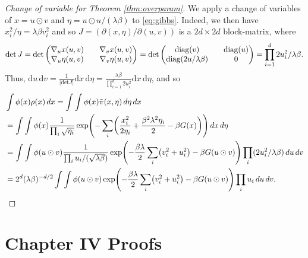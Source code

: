 \documentclass[11pt, twoside]{report}
\begin{document}
\begin{proof}[Change of variable for Theorem \ref{thm:overparam}]
We apply a change of variables of $x = u \odot v$ and $\eta = u \odot u /(\lambda \beta)$ to \eqref{eq:gibbs}. 
Indeed, we then have $x_i^2/\eta = \lambda\beta v_i^2$ and so $J = (\partial(x,\eta) / \partial(u,v))$ is a $2d \times 2d$ block-matrix, where
    $$\operatorname{det}J 
    = 
    \operatorname{det}\begin{pmatrix}
     \nabla_u x(u,v) && \nabla_v x(u,v) \\
     \nabla_u \eta(u,v) && \nabla_v \eta(u,v)
    \end{pmatrix} =\operatorname{det}\begin{pmatrix}
     \operatorname{diag}(v) && \operatorname{diag}(u) \\
     \operatorname{diag}(2u/\lambda\beta) && 0
    \end{pmatrix} = \prod_{i=1}^d 2u_i^2/\lambda\beta.$$
Thus, $\mathrm{d}u\,\mathrm{d}v = \frac{1}{|\mathrm{det}J|} \mathrm{d}
    x\,\mathrm{d}\eta = \frac{\lambda\beta}{\prod_{i=1}^d 2u_i^2} \mathrm{d}x\,\mathrm{d}\eta$, and so
\begin{align*}
    &\int \phi(x)\rho(x)\, dx = \int \int \phi(x) \tilde \pi(x,\eta)\,d\eta \,dx\\
    &=\int \int \phi(x) \frac{1}{\prod_{i} \sqrt{\eta_i}} \exp\pa{  -\sum_i \pa{ \frac{x_i^2}{2\eta_i} + \frac{\beta^2\lambda^2\eta_i}{2} -\beta G(x)} } \,dx\,d\eta\\
    &=\int \int \phi(u\odot v) \frac{1}{\prod_{i} u_i/(\sqrt{\lambda \beta})} \exp\pa{  -\frac{\beta\lambda}{2}\sum_i \pa{ v_i^2+u_i^2 } -\beta G(u\odot v) } \prod_i (2u_i^2/\lambda \beta) \,du\, dv\\
    &= 2^d (\lambda\beta)^{-d/2} \int \int \phi(u\odot v)  \exp\pa{  -\frac{\beta\lambda}{2}\sum_i \pa{  v_i^2+u_i^2 } -\beta G(u\odot v) } \prod_i u_i \,du\, dv.
\end{align*}
\end{proof}

\chapter{Chapter IV Proofs}
\label{bilevel_proofs}
\end{document}
